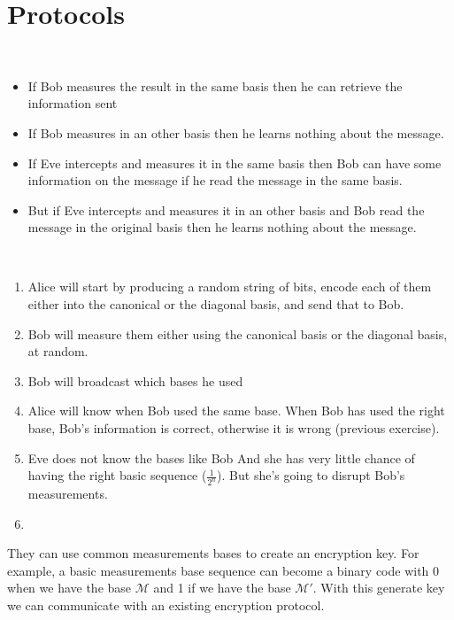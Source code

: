 \section{Protocols}

~

\begin{itemize}
  \item If Bob measures the result in the same basis then he can retrieve the
    information sent

  \item If Bob measures in an other basis then he learns nothing about the
    message.

  \item If Eve intercepts and measures it in the same basis then Bob can have
    some information on the message if he read the message in the same basis.

  \item But if Eve intercepts and measures it in an other basis and Bob read the
    message in the original basis then he learns nothing about the message.
\end{itemize}

\exo[BB84]~

\begin{enumerate}
  \item Alice will start by producing a random string of bits, encode each of
    them either into the canonical or the diagonal basis, and send that to Bob.

  \item Bob will measure them either using the canonical basis or the
    diagonal basis, at random.

  \item Bob will broadcast which bases he used

  \item Alice will know when Bob used the same base. When Bob has used the right
    base, Bob's information is correct, otherwise it is wrong (previous exercise).

  \item Eve does not know the bases like Bob And she has very little chance of
    having the right basic sequence ($\frac{1}{2^n}$). But she's going to
    disrupt Bob's measurements.

  \item 
\end{enumerate}

They can use common measurements bases to create an encryption key. For example,
a basic measurements base sequence can become a binary code with 0 when we have
the base $\mathcal M$ and 1 if we have the base $\mathcal M'$. With this
generate key we can communicate with an existing encryption protocol.

